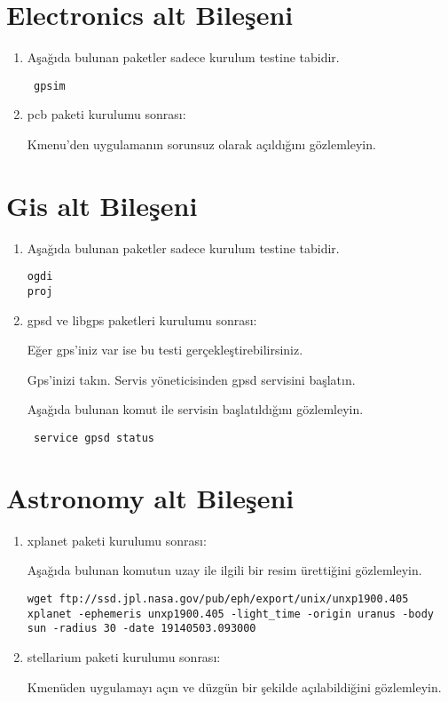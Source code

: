 \documentclass[a4paper,10pt]{article}
\begin{document}
\section{Electronics alt Bileşeni}
\begin{enumerate}
 \item Aşağıda bulunan paketler sadece kurulum testine tabidir.
\begin{verbatim}
 gpsim
\end{verbatim}
\item pcb paketi kurulumu sonrası:

Kmenu'den uygulamanın sorunsuz olarak açıldığını gözlemleyin.
\end{enumerate}


\section{Gis alt Bileşeni}
\begin{enumerate}
\item Aşağıda bulunan paketler sadece kurulum testine tabidir.
\begin{verbatim}
ogdi
proj
\end{verbatim}

 \item gpsd ve libgps paketleri kurulumu sonrası:

Eğer gps'iniz var ise bu testi gerçekleştirebilirsiniz.

Gps'inizi takın. Servis yöneticisinden gpsd servisini başlatın.

Aşağıda bulunan komut ile servisin başlatıldığını gözlemleyin.
\begin{verbatim}
 service gpsd status
\end{verbatim}


\end{enumerate}


\section{Astronomy alt Bileşeni}
\begin{enumerate}
\item xplanet paketi kurulumu sonrası:

Aşağıda bulunan komutun uzay ile ilgili bir resim ürettiğini gözlemleyin.
\begin{verbatim}
wget ftp://ssd.jpl.nasa.gov/pub/eph/export/unix/unxp1900.405
xplanet -ephemeris unxp1900.405 -light_time -origin uranus -body sun -radius 30 -date 19140503.093000  
\end{verbatim}

 \item stellarium paketi kurulumu sonrası:

Kmenüden uygulamayı açın ve düzgün bir şekilde açılabildiğini gözlemleyin. 
\end{enumerate}
\end{document}
